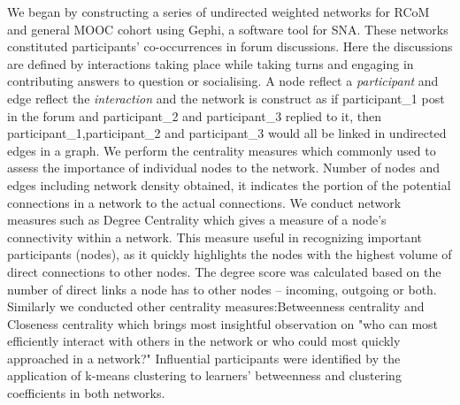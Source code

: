 \documentclass[format=acmsmall, review=false, screen=true]{acmart}
\begin{document}
We began by constructing a series of undirected weighted networks for RCoM and general MOOC cohort using Gephi, a software tool for SNA. These networks constituted participants’ co-occurrences in forum discussions. Here the discussions are defined by interactions taking place while taking turns and engaging in contributing answers to question or socialising. A node reflect a \textit{participant} and edge reflect the \textit{interaction} and the network is construct as if participant\_1 post in the forum and participant\_2 and participant\_3 replied to it, then participant\_1,participant\_2 and participant\_3 would all be linked in undirected edges in a graph. We perform the centrality measures which commonly used to assess the importance of individual nodes to the network. Number of nodes and edges including network density obtained, it indicates the portion of the potential connections in a network to the actual connections. We conduct network measures such as Degree Centrality which gives a measure of a node’s connectivity within a network. This measure useful in recognizing important participants (nodes), as it quickly highlights the nodes with the highest volume of direct connections to other nodes. The degree score was calculated based on the number of direct links a node has to other nodes – incoming, outgoing or both. Similarly we conducted other centrality measures:Betweenness centrality and Closeness centrality which brings most insightful observation on "who can most efficiently interact with others in the network or who could most quickly approached in a network?" Influential participants were identified by the application of k-means clustering to learners’ betweenness and clustering coefficients in both networks. 

\end{document}
